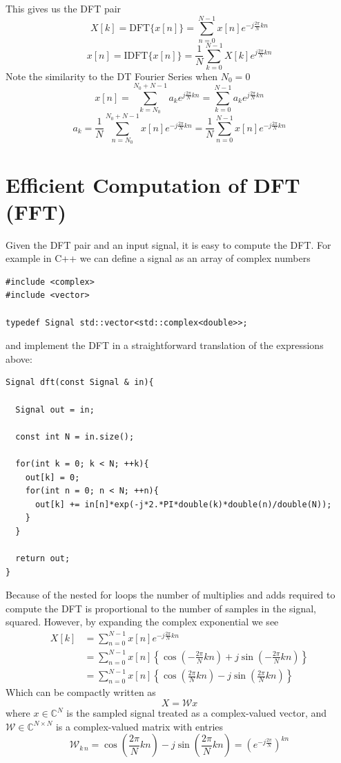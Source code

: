 This gives us the DFT pair
\[
X[k] = \text{DFT} \{ x[n] \} = \sum_{n = 0}^{N-1}  x[n] e^{-j \frac{2\pi}{N}k n}
\]
\[
x[n] = \text{IDFT} \{ x[n] \} = \frac{1}{N} \sum_{k = 0}^{N-1}  X[k] e^{j \frac{2\pi}{N}k n}
\]
Note the similarity to the DT Fourier Series when $N_0 = 0$
\[
x[n] = \sum\limits_{k = N_0}^{N_0 + N - 1} a_k e^{j\frac{2\pi}{N}kn} =  \sum\limits_{k = 0}^{N - 1} a_k e^{j\frac{2\pi}{N}kn}
\]
\[
a_k = \frac{1}{N}\sum\limits_{n = N_0}^{N_0 + N - 1} x[n] e^{-j\frac{2\pi}{N}kn} =  \frac{1}{N}\sum\limits_{n = 0}^{N - 1} x[n] e^{-j\frac{2\pi}{N}kn}
\]

\section{Efficient Computation of DFT (FFT)}

Given the DFT pair and an input signal, it is easy to compute the DFT. For example in C++ we can define a signal as an array of complex numbers

\begin{verbatim}
#include <complex>
#include <vector>

typedef Signal std::vector<std::complex<double>>;
\end{verbatim}

and implement the DFT in a straightforward translation of the expressions above:

\begin{verbatim}
Signal dft(const Signal & in){

  Signal out = in;
  
  const int N = in.size();

  for(int k = 0; k < N; ++k){
    out[k] = 0;
    for(int n = 0; n < N; ++n){
      out[k] += in[n]*exp(-j*2.*PI*double(k)*double(n)/double(N));
    }
  }

  return out;
}
\end{verbatim}

Because of the nested for loops the number of multiplies and adds required to compute the DFT is proportional to the number of samples in the signal, squared. However, by expanding the complex exponential we see
\begin{align*}
  X[k] &= \sum_{n = 0}^{N-1}  x[n] e^{-j \frac{2\pi}{N}k n}\\
  &= \sum_{n = 0}^{N-1}  x[n] \left\{ \cos\left( -\frac{2\pi}{N}k n\right) + j \sin\left(-\frac{2\pi}{N}k n \right)\right\}\\
  &= \sum_{n = 0}^{N-1}  x[n] \left\{ \cos\left( \frac{2\pi}{N}k n\right) - j \sin\left(\frac{2\pi}{N}k n \right)\right\}
\end{align*}
Which can be compactly written as
\[
X = \mathcal{W} x
\]
where $x \in \mathbb{C}^N$ is the sampled signal treated as a complex-valued vector, and $\mathcal{W} \in \mathbb{C}^{N\times N}$ is a complex-valued matrix with entries
\[
\mathcal{W}_{k\,n} = \cos\left( \frac{2\pi}{N}k n\right) - j \sin\left(\frac{2\pi}{N}k n \right) = \left( e^{-j\frac{2\pi}{N}}\right)^{kn}
\]  

